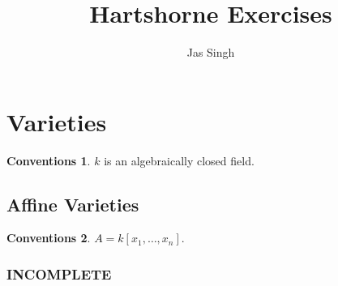 \documentclass[12pt]{article}
\title{Hartshorne Exercises}
\author{Jas Singh}
\date{}
\theoremstyle{definition}
\theoremstyle{definition}
\theoremstyle{definition}
\theoremstyle{definition}
\theoremstyle{definition}
\theoremstyle{definition}
\newtheorem*{conventions}{Conventions}
\begin{document}
\maketitle

\tableofcontents
\newpage

\section{Varieties}
    \begin{conventions}
        $k$ is an algebraically closed field.
    \end{conventions}
    
     \subsection{Affine Varieties}
         \begin{conventions}
             $A = k[x_1, \dots, x_n]$.
         \end{conventions}
 
 	     \subsubsection{INCOMPLETE} 
         \subsubsection{} 
         \subsubsection{} 
         \subsubsection{} 
         \subsubsection{} 
         \subsubsection{} 
         \subsubsection{} 
\end{document}

